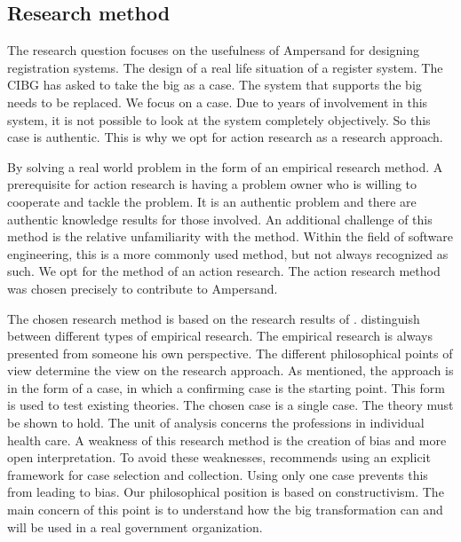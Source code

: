 \begin{comment}
\item[RQ1]- What knowledge is necessary for using Ampersand.
\item[RQ2]- What are the concepts and relationships in the new law big.
\item[RQ3]- Are the results useful for the CIBG organization.
\item[RQ4]- Is the description of the legislation and regulations, set up in such a way that this legislation can be used for the Ampersand method.
\end{comment}


\subsection{Research method} \label{research_method}

The research question focuses on the usefulness of Ampersand for designing registration systems.
The design of a real life situation of a register system.
The CIBG has asked to take the \acrshort{big} as a case.
The system that supports the \acrshort{big} needs to be replaced.
We focus on a case.
Due to years of involvement in this system, it is not possible to look at the system completely objectively.
So this case is authentic.
This is why we opt for action research as a research approach.

By solving a real world problem in the form of an empirical research method.
A prerequisite for action research is having a problem owner who is willing to cooperate and tackle the problem.
It is an authentic problem and there are authentic knowledge results for those involved.
An additional challenge of this method is the relative unfamiliarity with the method.
Within the field of software engineering, this is a more commonly used method, but not always recognized as such.
We opt for the method of an action research.
The action research\citep{Easterbrook} method was chosen precisely to contribute to Ampersand.

The chosen research method is based on the research results of \cite{Easterbrook}.
\cite{Easterbrook} distinguish between different types of empirical research. 
The empirical research is always presented from someone his own perspective. 
The different philosophical points of view determine the view on the research approach. 
As mentioned, the approach is in the form of a case, in which a confirming case is the starting point. 
This form is used to test existing theories. 
The chosen case is a single case. 
The theory must be shown to hold. 
The unit of analysis concerns the professions in individual health care. 
A weakness of this research method is the creation of bias and more open interpretation.
To avoid these weaknesses, \cite{Easterbrook} recommends using an explicit framework for case selection and collection.
Using only one case prevents this from leading to bias.
Our philosophical position is based on constructivism.
The main concern of this point is to understand how the \acrfull{big} transformation can and will be used in a real government organization.

